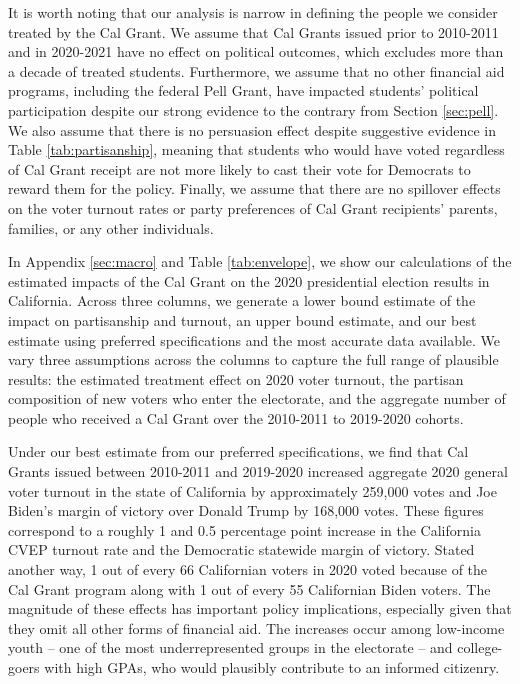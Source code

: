 \documentclass[12pt,letterpaper,oneside]{book}
\begin{document}
It is worth noting that our analysis is narrow in defining the people we consider treated by the Cal Grant. We assume that Cal Grants issued prior to 2010-2011 and in 2020-2021 have no effect on political outcomes, which excludes more than a decade of treated students. Furthermore, we assume that no other financial aid programs, including the federal Pell Grant, have impacted students' political participation despite our strong evidence to the contrary from Section \ref{sec:pell}. We also assume that there is no persuasion effect despite suggestive evidence in Table \ref{tab:partisanship}, meaning that students who would have voted regardless of Cal Grant receipt are not more likely to cast their vote for Democrats to reward them for the policy. Finally, we assume that there are no spillover effects on the voter turnout rates or party preferences of Cal Grant recipients' parents, families, or any other individuals.

In Appendix \ref{sec:macro} and Table \ref{tab:envelope}, we show our calculations of the estimated impacts of the Cal Grant on the 2020 presidential election results in California. Across three columns, we generate a lower bound estimate of the impact on partisanship and turnout, an upper bound estimate, and our best estimate using preferred specifications and the most accurate data available. We vary three assumptions across the columns to capture the full range of plausible results: the estimated treatment effect on 2020 voter turnout, the partisan composition of new voters who enter the electorate, and the aggregate number of people who received a Cal Grant over the 2010-2011 to 2019-2020 cohorts.

Under our best estimate from our preferred specifications, we find that Cal Grants issued between 2010-2011 and 2019-2020 increased aggregate 2020 general voter turnout in the state of California by approximately 259,000 votes and Joe Biden's margin of victory over Donald Trump by 168,000 votes. These figures correspond to a roughly 1 and 0.5 percentage point increase in the California CVEP turnout rate and the Democratic statewide margin of victory. Stated another way, 1 out of every 66 Californian voters in 2020 voted because of the Cal Grant program along with 1 out of every 55 Californian Biden voters. The magnitude of these effects has important policy implications, especially given that they omit all other forms of financial aid. The increases occur among low-income youth -- one of the most underrepresented groups in the electorate -- and college-goers with high GPAs, who would plausibly contribute to an informed citizenry.
\end{document}
